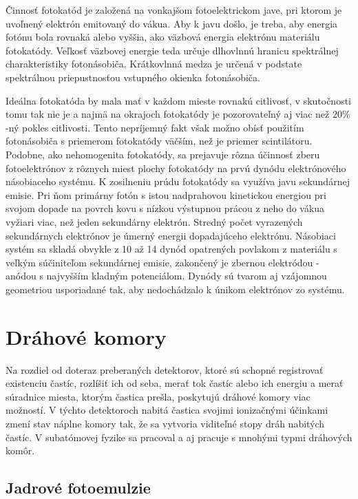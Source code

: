 \documentclass[../../main.tex]{subfiles}
\begin{document}
Činnosť fotokatód je založená na vonkajšom fotoelektrickom jave, pri ktorom je uvoľnený elektrón emitovaný do vákua. Aby k javu došlo, je treba, aby energia fotónu bola rovnaká alebo vyššia, ako väzbová energia elektrónu materiálu fotokatódy. Veľkosť väzbovej energie teda určuje dlhovlnnú hranicu spektrálnej charakteristiky fotonásobiča. Krátkovlnná medza je určená v podstate spektrálnou priepustnosťou vstupného okienka fotonásobiča.

Ideálna fotokatóda by mala mať v každom mieste rovnakú citlivosť, v skutočnosti tomu tak nie je a najmä na okrajoch fotokatódy je pozorovateľný aj viac než $20\%$-ný pokles citlivosti. Tento nepríjemný fakt však možno obísť použitím fotonásobiča s priemerom fotokatódy väčším, než je priemer scintilátoru. Podobne, ako nehomogenita fotokatódy, sa prejavuje rôzna účinnosť zberu fotoelektrónov z rôznych miest plochy fotokatódy na prvú dynódu elektrónového násobiaceho systému. K zosilneniu prúdu fotokatódy sa využíva javu sekundárnej emisie. Pri ňom primárny fotón s istou nadprahovou kinetickou energiou pri svojom dopade na povrch kovu s nízkou výstupnou prácou z neho do vákua vyžiari viac, než jeden sekundárny elektrón. Stredný počet vyrazených sekundárnych elektrónov je úmerný energii dopadajúceho elektrónu. Násobiaci systém sa skladá obvykle z 10 až 14 dynód opatrených povlakom z materiálu s veľkým súčiniteľom sekundárnej emisie, zakončený je zbernou elektródou - anódou s najvyšším kladným potenciálom. Dynódy sú tvarom aj vzájomnou geometriou usporiadané tak, aby nedochádzalo k únikom elektrónov zo systému.


\section{Dráhové komory}

Na rozdiel od doteraz preberaných detektorov, ktoré sú schopné registrovať existenciu častíc, rozlíšiť ich od seba, merať tok častíc alebo ich energiu a merať súradnice miesta, ktorým častica prešla, poskytujú dráhové komory viac možností. V týchto detektoroch nabitá častica svojimi ionizačnými účinkami zmení stav náplne komory tak, že sa vytvoria viditeľné stopy dráh nabitých častíc. V subatómovej fyzike sa pracoval a aj pracuje s mnohými typmi dráhových komôr.

\subsection{Jadrové fotoemulzie}
\end{document}
